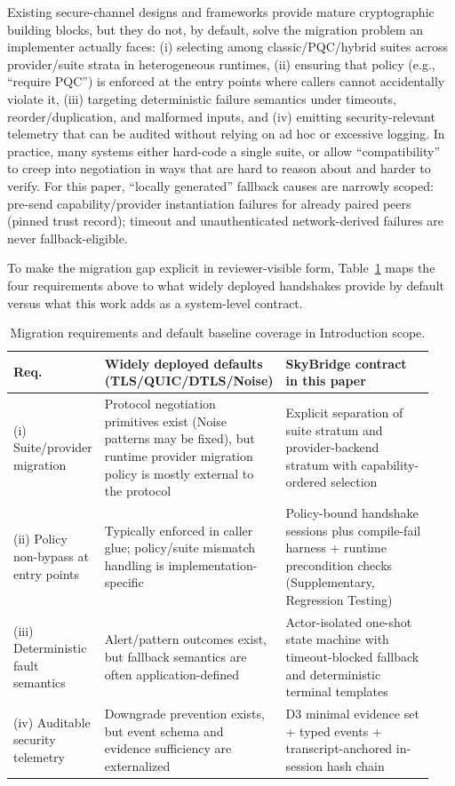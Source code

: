 \documentclass[10pt,journal,compsoc]{IEEEtran}
\begin{document}
Existing secure-channel designs and frameworks provide mature
cryptographic building blocks, but they do not, by default, solve the
migration problem an implementer actually faces: (i) selecting among
classic/PQC/hybrid suites across provider/suite strata in heterogeneous
runtimes, (ii) ensuring that
policy (e.g., ``require PQC'') is enforced at the entry points where
callers cannot accidentally violate it, (iii) targeting deterministic
failure semantics under timeouts, reorder/duplication, and malformed
inputs, and (iv) emitting security-relevant telemetry that can be
audited without relying on ad hoc or excessive logging. In
practice, many systems either hard-code a single suite, or allow
``compatibility'' to creep into negotiation in ways that are hard to
reason about and harder to verify.
For this paper, ``locally generated'' fallback causes are narrowly scoped:
pre-send capability/provider instantiation failures for already paired
peers (pinned trust record); timeout and unauthenticated network-derived
failures are never fallback-eligible.

To make the migration gap explicit in reviewer-visible form,
Table~\ref{tab:intro-migration-gap} maps the four requirements above to
what widely deployed handshakes provide by default versus what this work
adds as a system-level contract.

\begin{table}[!t]
\centering
\scriptsize
\caption{Migration requirements and default baseline coverage in Introduction scope.}
\label{tab:intro-migration-gap}
\begingroup
\setlength{\tabcolsep}{2pt}
\begin{tabular}{@{}p{0.16\linewidth}p{0.39\linewidth}p{0.39\linewidth}@{}}
\toprule
Req. & Widely deployed defaults (TLS/QUIC/DTLS/Noise) & SkyBridge contract in this paper \\
\midrule
(i) Suite/provider migration & Protocol negotiation primitives exist (Noise patterns may be fixed), but runtime provider migration policy is mostly external to the protocol & Explicit separation of suite stratum and provider-backend stratum with capability-ordered selection \\
(ii) Policy non-bypass at entry points & Typically enforced in caller glue; policy/suite mismatch handling is implementation-specific & Policy-bound handshake sessions plus compile-fail harness + runtime precondition checks (Supplementary, Regression Testing) \\
(iii) Deterministic fault semantics & Alert/pattern outcomes exist, but fallback semantics are often application-defined & Actor-isolated one-shot state machine with timeout-blocked fallback and deterministic terminal templates \\
(iv) Auditable security telemetry & Downgrade prevention exists, but event schema and evidence sufficiency are externalized & D3 minimal evidence set + typed events + transcript-anchored in-session hash chain \\
\bottomrule
\end{tabular}
\endgroup
\end{table}
\end{document}
